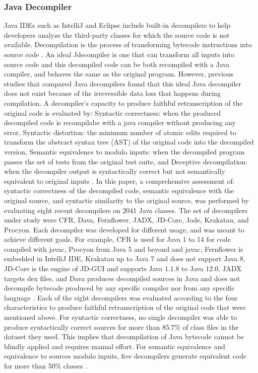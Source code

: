 \documentclass{article}
\begin{document}
\subsubsection{Java Decompiler}
Java IDEs such as IntelliJ and Eclipse include built-in decompilers to help developers analyze the third-party classes for which the source code is not available. Decompilation is the process of transforming bytecode instructions into source code \cite{harrand_java_2020}. An ideal Jdecompiler is one that can transform all inputs into source code and this decompiled code can be both recompiled with a Java compiler, and behaves the same as the original program. However, previous studies that compared Java decompilers found that this ideal Java decompiler does not exist because of the irreversible data loss that happens during compilation.
A decompiler’s capacity to produce faithful retranscription of the original code is evaluated by: Syntactic correctness: when the produced decompiled code is recompilabe with a java compiler without producing any error, Syntactic distortion: the minimum number of atomic edits required to transform the abstract syntax tree (AST) of the original code into the decompiled version, Semantic equivalence to modulo inputs: when the decompiled program passes the set of tests from the original test suite, and Deceptive decompilation: when the decompiler output is syntactically correct but not semantically equivalent to original inputs \cite{harrand_java_2020}.
In this paper, a comprehensive assessment of: syntactic correctness of the decompiled code, semantic equivalence with the original source, and syntactic similarity to the original source, was performed by evaluating eight recent decompilers on 2041 Java classes. The set of decompilers under study were CFR, Dava, Fernflower, JADX, JD-Core, Jode, Krakatau, and Procyon. Each decompiler was developed for different usage, and was meant to achieve different goals. For example, CFR is used for Java 1 to 14 for code compiled with javac, Procyon from Java 5 and beyond and javac, Fernflower is embedded in IntelliJ IDE, Krakatau up to Java 7 and does not support Java 8, JD-Core is the engine of JD-GUI and supports Java 1.1.8 to Java 12.0, JADX targets dex files, and Dava produces decompiled sources in Java and does not decompile bytecode produced by any specific compiler nor from any specific language \cite{harrand_java_2020}.
Each of the eight decompilers was evaluated according to the four characteristics to produce faithful retranscription of the original code that were mentioned above. For syntactic correctness, no single decompiler was able to produce syntactically correct sources for more than 85.7\% of class files in the dataset they used. This implies that decompilation of Java bytecode cannot be blindly applied and requires manual effort. For semantic equivalence and equivalence to sources modulo inputs, five decompilers generate equivalent code for more than 50\% classes \cite{harrand_java_2020}.
\end{document}
